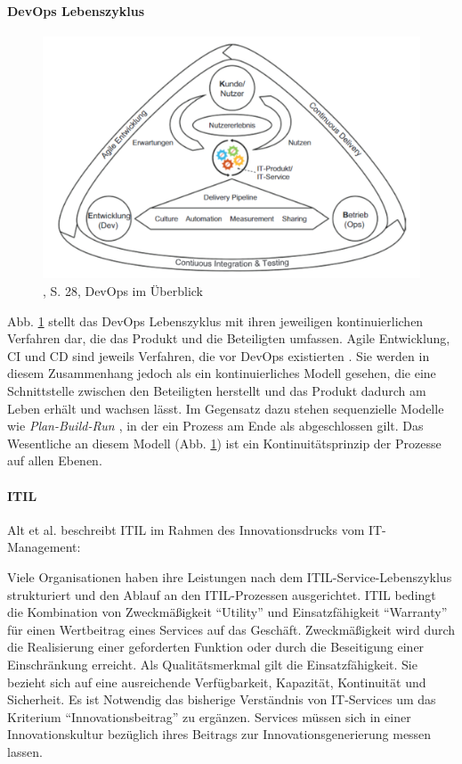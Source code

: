 \paragraph{DevOps Lebenszyklus}
\begin{figure}[htbp]
 \centering
 \includegraphics[width=1.0\textwidth]{gfx/devops_ueberblick.PNG}
 \caption{\citet{Alt2017}, S. 28, DevOps im Überblick\label{fig:devops}}
\end{figure}
\medskip
Abb. \ref{fig:devops} stellt das DevOps Lebenszyklus mit ihren jeweiligen kontinuierlichen Verfahren dar, die das Produkt und die Beteiligten umfassen. Agile Entwicklung, \ac{CI} und \ac{CD} sind jeweils Verfahren, die vor DevOps existierten \cite{Alt2017}. Sie werden in diesem Zusammenhang jedoch als ein kontinuierliches Modell gesehen, die eine Schnittstelle zwischen den Beteiligten herstellt und das Produkt dadurch am Leben erhält und wachsen lässt. Im Gegensatz dazu stehen sequenzielle Modelle wie \emph{Plan-Build-Run \cite{Koch2016}}, in der ein Prozess am Ende als abgeschlossen gilt. Das Wesentliche an diesem Modell (Abb. \ref{fig:devops}) ist ein Kontinuitätsprinzip \cite{Alt2017} der Prozesse auf allen Ebenen.

\paragraph{ITIL}
Alt et al. beschreibt ITIL im Rahmen des Innovationsdrucks vom IT-Management:

Viele Organisationen haben ihre Leistungen nach dem ITIL-Service-Lebenszyklus strukturiert und den Ablauf an den ITIL-Prozessen ausgerichtet. ITIL bedingt die Kombination von Zweckmäßigkeit \enquote{Utility} und Einsatzfähigkeit \enquote{Warranty} für einen Wertbeitrag eines Services auf das Geschäft. Zweckmäßigkeit wird durch die Realisierung einer geforderten Funktion oder durch die Beseitigung einer Einschränkung erreicht. Als Qualitätsmerkmal gilt die Einsatzfähigkeit. Sie bezieht sich auf eine ausreichende Verfügbarkeit, Kapazität, Kontinuität und Sicherheit. Es ist Notwendig das bisherige Verständnis von IT-Services um das Kriterium \enquote{Innovationsbeitrag} zu ergänzen. Services müssen sich in einer Innovationskultur bezüglich ihres Beitrags zur Innovationsgenerierung messen lassen.

